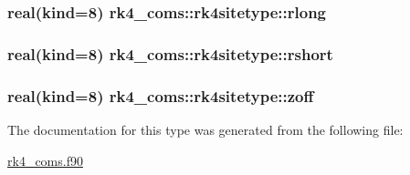 \subsubsection[{rlong}]{\setlength{\rightskip}{0pt plus 5cm}real(kind=8) rk4\+\_\+coms\+::rk4sitetype\+::rlong}\label{structrk4__coms_1_1rk4sitetype_a35e8637a2b0671ae8e77be899aba8f58}
\hypertarget{structrk4__coms_1_1rk4sitetype_af79527d4a144d7cbc0e85ea433d4d736}{}
\subsubsection[{rshort}]{\setlength{\rightskip}{0pt plus 5cm}real(kind=8) rk4\+\_\+coms\+::rk4sitetype\+::rshort}\label{structrk4__coms_1_1rk4sitetype_af79527d4a144d7cbc0e85ea433d4d736}
\hypertarget{structrk4__coms_1_1rk4sitetype_ae287d5e2de06575d3a27e51b5fce0acd}{}
\subsubsection[{zoff}]{\setlength{\rightskip}{0pt plus 5cm}real(kind=8) rk4\+\_\+coms\+::rk4sitetype\+::zoff}\label{structrk4__coms_1_1rk4sitetype_ae287d5e2de06575d3a27e51b5fce0acd}


The documentation for this type was generated from the following file\+:\begin{DoxyCompactItemize}
\item 
\hyperlink{rk4__coms_8f90}{rk4\+\_\+coms.\+f90}\end{DoxyCompactItemize}
